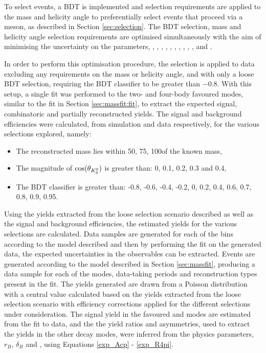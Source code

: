 To select \btodkst events, a BDT is implemented and selection requirements are applied to the \Kstarm mass and \KS helicity angle to preferentially select events that proceed via a \Kstarm meson, as described in Section \ref{sec:selection}. The BDT selection, \Kstarm mass and \KS helicity angle selection requirements are optimised simultaneously with the aim of minimising the uncertainty on the \CP parameters, \Akpi, \Akk, \Apipi, \Rkk, \Rpipi, \Rptwo, \Rmtwo, \Akpipipi, \Apipipipi, \Rpipipipi, \Rpfour and \Rmfour. 

In order to perform this optimisation procedure, the selection is applied to data excluding any requirements on the \Kstarm mass or \KS helicity angle, and with only a loose BDT selection, requiring the BDT classifier to be greater than $-0.8$. With this setup, a single fit was performed to the two- and four-body favoured modes, similar to the fit in Section \ref{sec:massfit:fit}, to extract the expected signal, combinatoric and partially reconstructed yields. The signal and background efficiencies were calculated, from simulation and data respectively, for the various selections explored, namely:

\begin{itemize}
\item{The reconstructed \Kstarm mass lies within 50\mevcc, 75\mevcc, 100\mevcc of the known \Kstarm mass,}
\item{The magnitude of $\cos(\theta_{{{K}^0_{\mathrm{ \scriptscriptstyle S}}}})$ is greater than: 0, 0.1, 0.2, 0.3 and 0.4,}
\item{The BDT classifier is greater than: -0.8, -0.6, -0.4, -0.2, 0, 0.2, 0.4, 0.6, 0.7, 0.8, 0.9, 0.95.}
\end{itemize}

Using the yields extracted from the loose selection scenario described as well as the signal and background efficiencies, the estimated yields for the various selections are calculated. Data samples are generated for each of the bins according to the model described and then by performing the \CP fit on the generated data, the expected uncertainties in the \CP observables can be extracted. Events are generated according to the model described in Section \ref{sec:massfit}, producing a data sample for each of the \Dz modes, data-taking periods and \KS reconstruction types present in the \CP fit. The yields generated are drawn from a Poisson distribution with a central value calculated based on the yields extracted from the loose selection scenario with efficiency corrections applied for the different selections under consideration. The signal yield in the favoured \kpi and \kpipipi modes are estimated from the fit to data, and the the yield ratios and asymmetries, used to extract the yields in the other \Dz decay modes, were inferred from the physics parameters, $r_B$, $\delta_B$ and \Pgamma, using Equations \ref{exp_Acp} - \ref{exp_R4pi}. 

